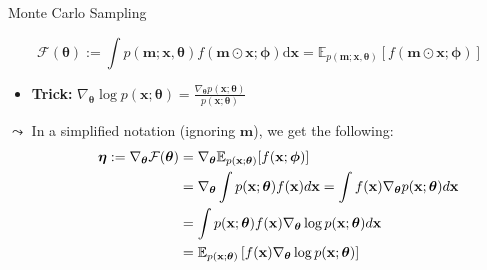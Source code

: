 \documentclass[11pt,compress,t,notes=noshow, aspectratio=169, xcolor=table]{beamer}
\begin{document}
\begin{frame}{Monte Carlo Sampling}
 
$$
\mathcal{F}(\boldsymbol{\theta}):=\int p(\mathbf{m} ; \mathbf{x}, \boldsymbol{\theta}) f(\mathbf{m} \odot \mathbf{x} ; \boldsymbol{\phi}) \mathrm{d} \mathbf{x}=\mathbb{E}_{p(\mathbf{m} ; \mathbf{x}, \boldsymbol{\theta})}[f(\mathbf{m} \odot \mathbf{x} ; \boldsymbol{\phi})] 
$$


    \begin{itemize}
        \item \textbf{Trick:} $\nabla_{\boldsymbol{\theta}} \log p(\mathbf{x} ; \boldsymbol{\theta})=\frac{\nabla_{\boldsymbol{\theta}} p(\mathbf{x} ; \boldsymbol{\theta})}{p(\mathbf{x} ; \boldsymbol{\theta})}$
    \end{itemize}
\medskip

$\leadsto$ In a simplified notation (ignoring $\mathbf{m}$), we get the following:
$$
\smallskip
    \begin{aligned}
        \,\,\,\,\,\,\,\,\,\,\,\,\,\,\,\,
        \boldsymbol{\eta}:=\nabla_{\boldsymbol{\theta}} \mathcal{F}(\boldsymbol{\theta}) &=\nabla_{\boldsymbol{\theta}} \mathbb{E}_{p(\mathbf{x} ; \boldsymbol{\theta})}[f(\mathbf{x} ; \boldsymbol{\phi})] \\
        &=\nabla_{\boldsymbol{\theta}} \int p(\mathbf{x} ; \boldsymbol{\theta}) f(\mathbf{x}) d \mathbf{x}=\int f(\mathbf{x}) \nabla_{\boldsymbol{\theta}} p(\mathbf{x} ; \boldsymbol{\theta}) d \mathbf{x} \\
        &=\int p(\mathbf{x} ; \boldsymbol{\theta}) f(\mathbf{x}) \nabla_{\boldsymbol{\theta}} \log p(\mathbf{x} ; \boldsymbol{\theta}) d \mathbf{x} \\
        &=\mathbb{E}_{p(\mathbf{x} ; \boldsymbol{\theta})}\left[f(\mathbf{x}) \nabla_{\boldsymbol{\theta}} \log p(\mathbf{x} ; \boldsymbol{\theta})\right]
    \end{aligned}
$$
\end{frame}
\end{document}
